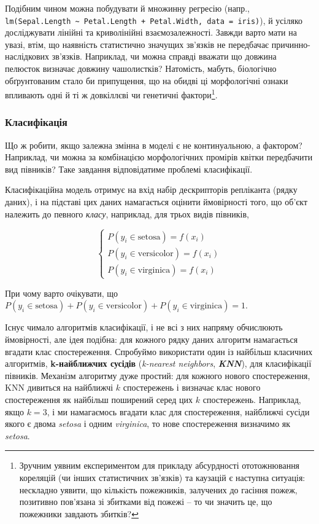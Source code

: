 \documentclass[
  11pt,
]{book}
\begin{document}
Подібним чином можна побудувати й множинну регресію (напр., \texttt{lm(Sepal.Length\ \textasciitilde{}\ Petal.Length\ +\ Petal.Width,\ data\ =\ iris)}), й усіляко досліджувати лінійні та криволінійні взаємозалежності. Завжди варто мати на увазі, втім, що наявність статистично значущих зв'язків не передбачає причинно-наслідкових зв'язків. Наприклад, чи можна справді вважати що довжина пелюсток визначає довжину чашолистків? Натомість, мабуть, біологічно обґрунтованим стало би припущення, що на обидві ці морфологічні ознаки впливають одні й ті ж довкіллєві чи генетичні фактори\footnote{Зручним уявним експериментом для прикладу абсурдності ототожнювання кореляцій (чи інших статистичних зв'язків) та каузацій є наступна ситуація: нескладно уявити, що кількість пожежників, залучених до гасіння пожеж, позитивно пов'язана зі збитками від пожежі -- то чи значить це, що пожежники завдають збитків?}.

\subsubsection{Класифікація}\label{classifier}

Що ж робити, якщо залежна змінна в моделі є не континуальною, а фактором? Наприклад, чи можна за комбінацією морфологічних промірів квітки передбачити вид півників? Таке завдання відповідатиме проблемі класифікації.

Класифікаційна модель отримує на вхід набір дескрипторів репліканта (рядку даних), і на підставі цих даних намагається оцінити ймовірності того, що об'єкт належить до певного \emph{класу}, наприклад, для трьох видів півників,

\[
\begin{cases}
    P(y_i \in \text{setosa}) = f(x_i) \\
    P(y_i \in \text{versicolor}) = f(x_i) \\
    P(y_i \in \text{virginica}) = f(x_i)
\end{cases}
\]

При чому варто очікувати, що \(P(y_i \in \text{setosa}) + P(y_i \in \text{versicolor}) + P(y_i \in \text{virginica}) = 1\).

Існує чимало алгоритмів класифікації, і не всі з них напряму обчислюють ймовірності, але ідея подібна: для кожного рядку даних алгоритм намагається вгадати клас спостереження. Спробуймо використати один із найбільш класичних алгоритмів, \textbf{k-найближчих сусідів} (\emph{k-nearest neighbors}, \textbf{\emph{KNN}}), для класифікації півників. Механізм алгоритму дуже простий: для кожного нового спостереження, KNN дивиться на найближчі \(k\) спостережень і визначає клас нового спостереження як найбільш поширений серед цих \(k\) спостережень. Наприклад, якщо \(k=3\), і ми намагаємось вгадати клас для спостереження, найближчі сусіди якого є двома \emph{setosa} і одним \emph{virginica}, то нове спостереження визначимо як \emph{setosa}.
\end{document}
